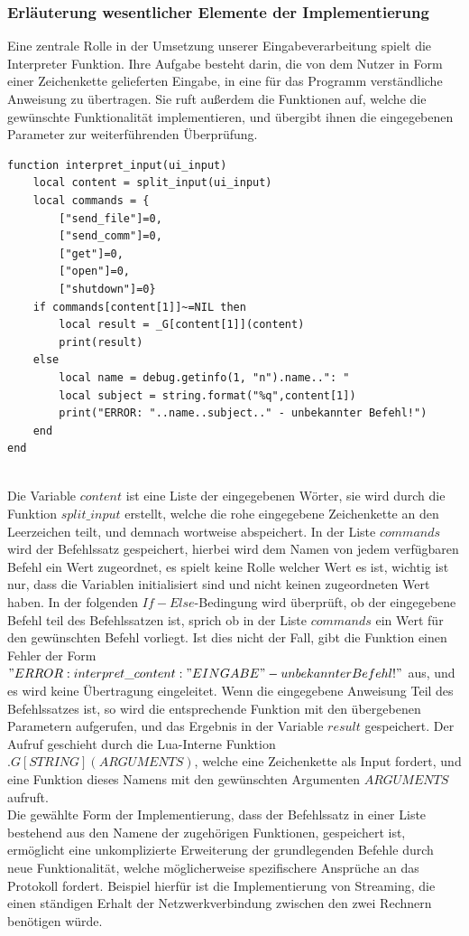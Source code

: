 \documentclass[12pt, a4paper]{scrartcl}
\begin{document}
\subsubsection{Erläuterung wesentlicher Elemente der Implementierung}
Eine zentrale Rolle in der Umsetzung unserer Eingabeverarbeitung spielt die Interpreter Funktion. Ihre Aufgabe besteht darin, die von dem Nutzer in Form einer Zeichenkette gelieferten Eingabe, in eine für das Programm verständliche Anweisung zu übertragen. Sie ruft außerdem die Funktionen auf, welche die gewünschte Funktionalität implementieren, und übergibt ihnen die eingegebenen Parameter zur weiterführenden Überprüfung.\\
\begin{lstlisting}[caption = {Interpreter Funktion}]
function interpret_input(ui_input)
    local content = split_input(ui_input)
    local commands = {
        ["send_file"]=0,
        ["send_comm"]=0,
        ["get"]=0,
        ["open"]=0,
        ["shutdown"]=0}
    if commands[content[1]]~=NIL then
        local result = _G[content[1]](content)
        print(result)
    else
        local name = debug.getinfo(1, "n").name..": "
        local subject = string.format("%q",content[1])
        print("ERROR: "..name..subject.." - unbekannter Befehl!")
    end
end
\end{lstlisting}\hfill\\
Die Variable $content$ ist eine Liste der eingegebenen Wörter, sie wird durch die Funktion $split\_input$ erstellt, welche die rohe eingegebene Zeichenkette an den Leerzeichen teilt, und demnach wortweise abspeichert. In der Liste $commands$ wird der Befehlssatz gespeichert, hierbei wird dem Namen von jedem verfügbaren Befehl ein Wert zugeordnet, es spielt keine Rolle welcher Wert es ist, wichtig ist nur, dass die Variablen initialisiert sind und nicht keinen zugeordneten Wert haben. In der folgenden $If-Else$-Bedingung wird überprüft, ob der eingegebene Befehl teil des Befehlssatzen ist, sprich ob in der Liste $commands$ ein Wert für den gewünschten Befehl vorliegt. Ist dies nicht der Fall, gibt die Funktion einen Fehler der Form $"ERROR: interpret\_content: "EINGABE" - unbekannter Befehl!"$ aus, und es wird keine Übertragung eingeleitet. Wenn die eingegebene Anweisung Teil des Befehlssatzes ist, so wird die entsprechende Funktion mit den übergebenen Parametern aufgerufen, und das Ergebnis in der Variable $result$ gespeichert. Der Aufruf geschieht durch die Lua-Interne Funktion $.G[STRING](ARGUMENTS)$, welche eine Zeichenkette als Input fordert, und eine Funktion dieses Namens mit den gewünschten Argumenten $ARGUMENTS$ aufruft.\\ Die gewählte Form der Implementierung, dass der Befehlssatz in einer Liste bestehend aus den Namene der zugehörigen Funktionen, gespeichert ist, ermöglicht eine unkomplizierte Erweiterung der grundlegenden Befehle durch neue Funktionalität, welche möglicherweise spezifischere Ansprüche an das Protokoll fordert. Beispiel hierfür ist die Implementierung von Streaming, die einen ständigen Erhalt der Netzwerkverbindung zwischen den zwei Rechnern benötigen würde. \\
\end{document}
